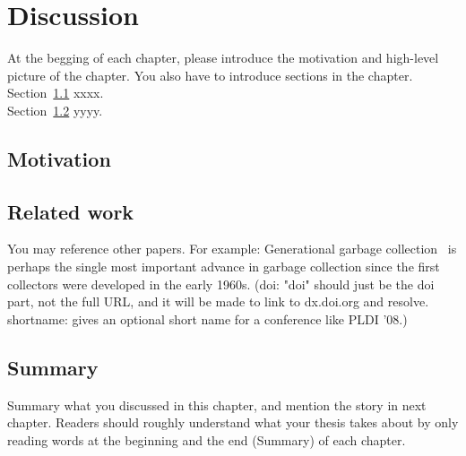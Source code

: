 \chapter{Discussion}
\label{cha:discussion}
At the begging of each chapter, please introduce the motivation and high-level
picture of the chapter. You also have to introduce sections in the
chapter. \\


Section~\ref{sec:motivation} xxxx.\\

Section~\ref{sec:relatedwork} yyyy.\\

\section{Motivation}
\label{sec:motivation}

\section{Related work}
\label{sec:relatedwork}
You may reference other papers. For example: 
Generational garbage collection~\citep{LH:83,Moon:84,Ungar:84} is perhaps the
single most important advance in garbage collection since the first collectors
were developed in the early 1960s. (doi: "doi" should just be the doi part, not
the full URL, and it will be made to link to dx.doi.org and resolve.
shortname: gives an optional short name for a conference like PLDI '08.)





\section{Summary}
Summary what you discussed in this chapter, and mention the story in next
chapter. Readers should roughly understand what your thesis takes about by only reading
words at the beginning and the end (Summary) of each chapter.



